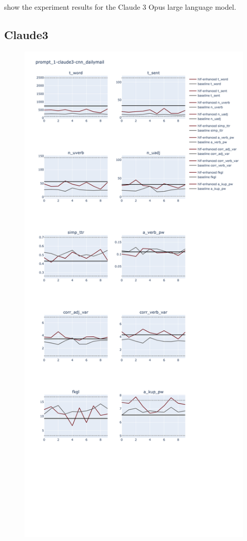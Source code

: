\documentclass[a4paper,twoside]{article}
\begin{document}
show the experiment results for the Claude 3 Opus large language model.

\subsection{Claude3}

\begin{figure}[ht]
    \includegraphics[width=\textwidth,height=0.9\textheight,scale=1]{plots/prompt_1/prompt_1-claude3-cnn_dailymail/prompt_1-claude3-cnn_dailymail.png}

\end{figure}
\end{document}
